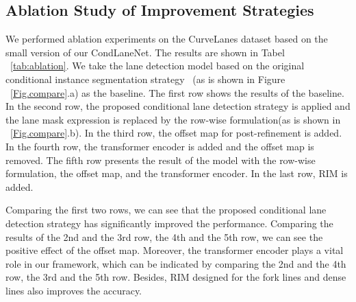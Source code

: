 \documentclass[10pt,twocolumn,letterpaper]{article}
\begin{document}
\subsection{Ablation Study of Improvement Strategies}
We performed ablation experiments on the CurveLanes dataset based on the small version of our CondLaneNet. The results are shown in Tabel ~\ref{tab:ablation}. We take the lane detection model based on the original conditional instance segmentation strategy~\cite{tian2020conditional, wang2020solov2} (as is shown in Figure ~\ref{Fig.compare}.a) as the baseline.  The first row shows the results of the baseline. In the second row, the proposed conditional lane detection strategy is applied and the lane mask expression is replaced by the row-wise formulation(as is shown in ~\ref{Fig.compare}.b). In the third row, the offset map for post-refinement is added. In the fourth row, the transformer encoder is added and the offset map is removed. The fifth row presents the result of the model with the row-wise formulation, the offset map, and the transformer encoder. In the last row, RIM is added.

\begin{table}[h]
\centering
{}
\caption{Ablation study of the improvement strategies on CurveLanes base on the small version of our CondLaneNet.}
\label{tab:ablation}
\end{table}

Comparing the first two rows, we can see that the proposed conditional lane detection strategy has significantly improved the performance. Comparing the results of the 2nd and the 3rd row, the 4th and the 5th row, we can see the positive effect of the offset map. Moreover, the transformer encoder plays a vital role in our framework, which can be indicated by comparing the 2nd and the 4th row, the 3rd and the 5th row. Besides, RIM designed for the fork lines and dense lines also improves the accuracy.
\end{document}
